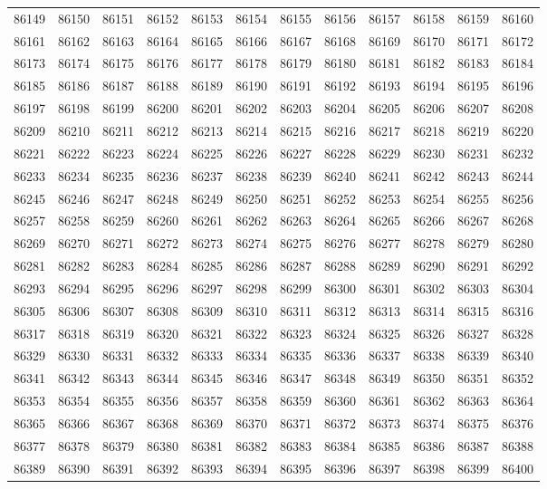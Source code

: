 \begin{center}
\begin{longtable}{llllllllllll}
86149 &86150 &86151 &86152 &86153 &86154 &86155 &86156 &86157 &86158 &86159 &86160 \\
86161 &86162 &86163 &86164 &86165 &86166 &86167 &86168 &86169 &86170 &86171 &86172 \\
86173 &86174 &86175 &86176 &86177 &86178 &86179 &86180 &86181 &86182 &86183 &86184 \\
86185 &86186 &86187 &86188 &86189 &86190 &86191 &86192 &86193 &86194 &86195 &86196 \\
86197 &86198 &86199 &86200 &86201 &86202 &86203 &86204 &86205 &86206 &86207 &86208 \\
86209 &86210 &86211 &86212 &86213 &86214 &86215 &86216 &86217 &86218 &86219 &86220 \\
86221 &86222 &86223 &86224 &86225 &86226 &86227 &86228 &86229 &86230 &86231 &86232 \\
86233 &86234 &86235 &86236 &86237 &86238 &86239 &86240 &86241 &86242 &86243 &86244 \\
86245 &86246 &86247 &86248 &86249 &86250 &86251 &86252 &86253 &86254 &86255 &86256 \\
86257 &86258 &86259 &86260 &86261 &86262 &86263 &86264 &86265 &86266 &86267 &86268 \\
86269 &86270 &86271 &86272 &86273 &86274 &86275 &86276 &86277 &86278 &86279 &86280 \\
86281 &86282 &86283 &86284 &86285 &86286 &86287 &86288 &86289 &86290 &86291 &86292 \\
86293 &86294 &86295 &86296 &86297 &86298 &86299 &86300 &86301 &86302 &86303 &86304 \\
86305 &86306 &86307 &86308 &86309 &86310 &86311 &86312 &86313 &86314 &86315 &86316 \\
86317 &86318 &86319 &86320 &86321 &86322 &86323 &86324 &86325 &86326 &86327 &86328 \\
86329 &86330 &86331 &86332 &86333 &86334 &86335 &86336 &86337 &86338 &86339 &86340 \\
86341 &86342 &86343 &86344 &86345 &86346 &86347 &86348 &86349 &86350 &86351 &86352 \\
86353 &86354 &86355 &86356 &86357 &86358 &86359 &86360 &86361 &86362 &86363 &86364 \\
86365 &86366 &86367 &86368 &86369 &86370 &86371 &86372 &86373 &86374 &86375 &86376 \\
86377 &86378 &86379 &86380 &86381 &86382 &86383 &86384 &86385 &86386 &86387 &86388 \\
86389 &86390 &86391 &86392 &86393 &86394 &86395 &86396 &86397 &86398 &86399 &86400 \\

\end{longtable}
\end{center}

